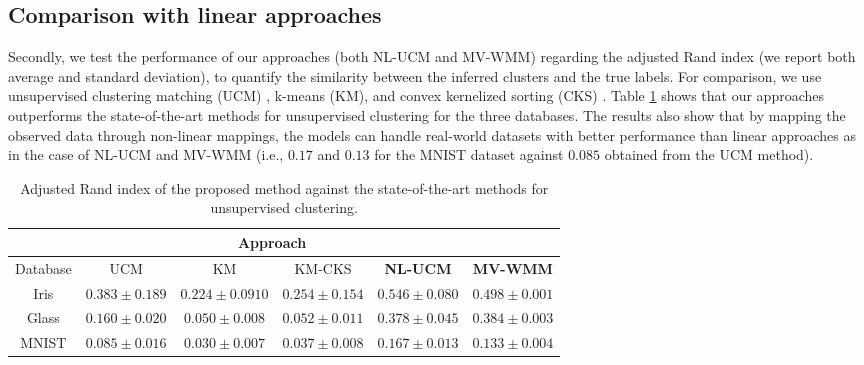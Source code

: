 \documentclass[]{article}
\begin{document}
\subsection{Comparison with linear approaches}

Secondly, we test the performance of our approaches (both NL-UCM and MV-WMM) regarding the adjusted Rand index (we report both average and standard deviation), to quantify the similarity between the inferred clusters \cite{Iwata16} and the true labels. For comparison, we use unsupervised clustering matching (UCM) \cite{Iwata16}, k-means (KM), and convex kernelized sorting (CKS) \cite{Djuric12}. Table \ref{tab:comparison} shows that our approaches outperforms the state-of-the-art methods for unsupervised clustering for the three databases. The results also show that by mapping the observed data through  non-linear mappings, the models can handle real-world datasets with better performance than linear approaches as in the case of NL-UCM and MV-WMM (i.e., $0.17$ and $0.13$ for the MNIST dataset against $0.085$ obtained from the UCM method). 

\begin{table}[ht!]
	\centering
	\caption{Adjusted Rand index of the proposed method against the state-of-the-art methods for unsupervised clustering.}
	\label{tab:comparison}
	\begin{tabular}{c c c c c c}
		\cline{2-6}
		& \multicolumn{4}{c}{\textbf{Approach}}\\
		\hline
		Database &  	UCM & KM & KM-CKS& \textbf{NL-UCM} & \textbf{MV-WMM}\\
		\hline\hline
		Iris & $0.383\pm0.189$ &  $0.224 \pm 0.0910$  &  $0.254 \pm 0.154$ &$\mathbf{0.546\pm 0.080}$ & $\mathbf{0.498\pm 0.001}$\\
		Glass & $0.160 \pm 0.020$ & $0.050 \pm 0.008$     &  $0.052 \pm 0.011$       & $\mathbf{0.378\pm 0.045}$ & $\mathbf{0.384\pm 0.003}$\\
		MNIST & $0.085 \pm 0.016$&      $0.030 \pm 0.007$   &  $0.037 \pm 0.008$  & $\mathbf{0.167\pm 0.013}$ & $\mathbf{0.133\pm 0.004}$\\
	\end{tabular}
\end{table}
\end{document}
